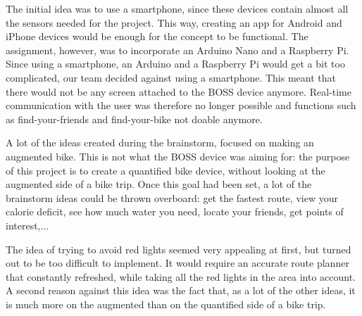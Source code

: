 The initial idea was to use a smartphone, since these devices contain almost all the sensors needed for the project. 
This way, creating an app for Android and iPhone devices would be enough for the concept to be functional. 
The assignment, however, was to incorporate an Arduino Nano and a Raspberry Pi. 
Since using a smartphone, an Arduino and a Raspberry Pi would get a bit too complicated, our team decided against using a smartphone. 
This meant that there would not be any screen attached to the BOSS device anymore. 
Real-time communication with the user was therefore no longer possible and functions such as find-your-friends and find-your-bike not doable anymore. 

A lot of the ideas created during the brainstorm, focused on making an augmented bike. 
This is not what the BOSS device was aiming for: the purpose of this project is to create a quantified bike device, without looking at the augmented side of a bike trip. 
Once this goal had been set, a lot of the brainstorm ideas could be thrown overboard: get the fastest route, view your calorie deficit, see how much water you need, locate your friends, get points of interest,...

The idea of trying to avoid red lights seemed very appealing at first, but turned out to be too difficult to implement. 
It would require an accurate route planner that constantly refreshed, while taking all the red lights in the area into account. 
A second reason against this idea was the fact that, as a lot of the other ideas, it is much more on the augmented than on the quantified side of a bike trip. 
